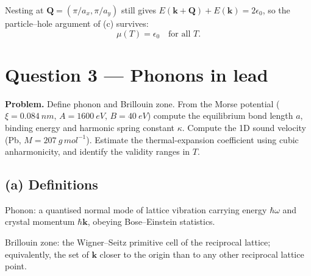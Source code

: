 \documentclass[11pt]{article}
\begin{document}
\begin{center}
\end{center}

Nesting at $\bm Q=(\pi/a_x,\pi/a_y)$ still gives $E(\bm k+\bm Q)+E(\bm k)=2\epsilon_0$, so the particle--hole argument of (c) survives:
\[
\boxed{\;\mu(T) = \epsilon_0\quad\text{for all }T.\;}
\]

\section*{Question 3 --- Phonons in lead}

\textbf{Problem.} Define phonon and Brillouin zone. From the Morse potential ($\xi=\SI{0.084}{nm},\,A=\SI{1600}{eV},\,B=\SI{40}{eV}$) compute the equilibrium bond length $a$, binding energy and harmonic spring constant $\kappa$. Compute the 1D sound velocity (Pb, $M=\SI{207}{g\,mol^{-1}}$). Estimate the thermal-expansion coefficient using cubic anharmonicity, and identify the validity ranges in $T$.

\subsection*{(a) Definitions}

Phonon: a quantised normal mode of lattice vibration carrying energy $\hbar\omega$ and crystal momentum $\hbar\bm k$, obeying Bose--Einstein statistics.

Brillouin zone: the Wigner--Seitz primitive cell of the reciprocal lattice; equivalently, the set of $\bm k$ closer to the origin than to any other reciprocal lattice point.
\end{document}
